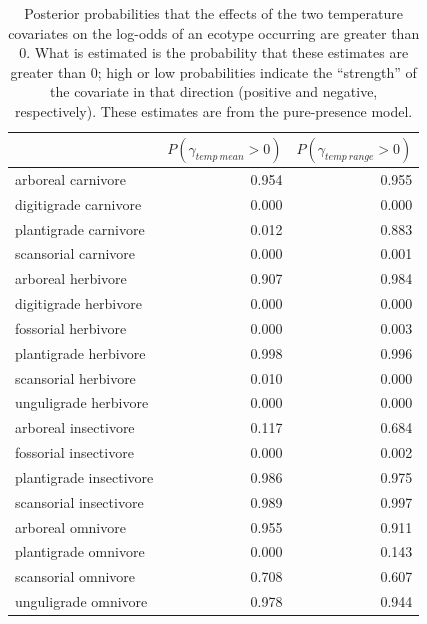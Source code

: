 \documentclass[12pt,letterpaper]{article}
\begin{document}
\begin{table}[ht]
  \centering
  \caption[Posterior probablity of effects of temperature on occurrence]{Posterior probabilities that the effects of the two temperature covariates on the log-odds of an ecotype occurring are greater than 0. What is estimated is the probability that these estimates are greater than 0; high or low probabilities indicate the ``strength'' of the covariate in that direction (positive and negative, respectively). These estimates are from the pure-presence model.}
  \label{tab:occur_temp}
  \begin{tabular}{ l r r }
    \hline
    & \(P(\gamma_{temp\ mean} > 0)\) & \(P(\gamma_{temp\ range} > 0)\) \\ 
    \hline
    arboreal carnivore & 0.954 & 0.955 \\ 
    digitigrade carnivore & 0.000 & 0.000 \\ 
    plantigrade carnivore & 0.012 & 0.883 \\ 
    scansorial carnivore & 0.000 & 0.001 \\ 
    arboreal herbivore & 0.907 & 0.984 \\ 
    digitigrade herbivore & 0.000 & 0.000 \\ 
    fossorial herbivore & 0.000 & 0.003 \\ 
    plantigrade herbivore & 0.998 & 0.996 \\ 
    scansorial herbivore & 0.010 & 0.000 \\ 
    unguligrade herbivore & 0.000 & 0.000 \\ 
    arboreal insectivore & 0.117 & 0.684 \\ 
    fossorial insectivore & 0.000 & 0.002 \\ 
    plantigrade insectivore & 0.986 & 0.975 \\ 
    scansorial insectivore & 0.989 & 0.997 \\ 
    arboreal omnivore & 0.955 & 0.911 \\ 
    plantigrade omnivore & 0.000 & 0.143 \\ 
    scansorial omnivore & 0.708 & 0.607 \\ 
    unguligrade omnivore & 0.978 & 0.944 \\ 
    \hline
  \end{tabular}
\end{table}
\end{document}
